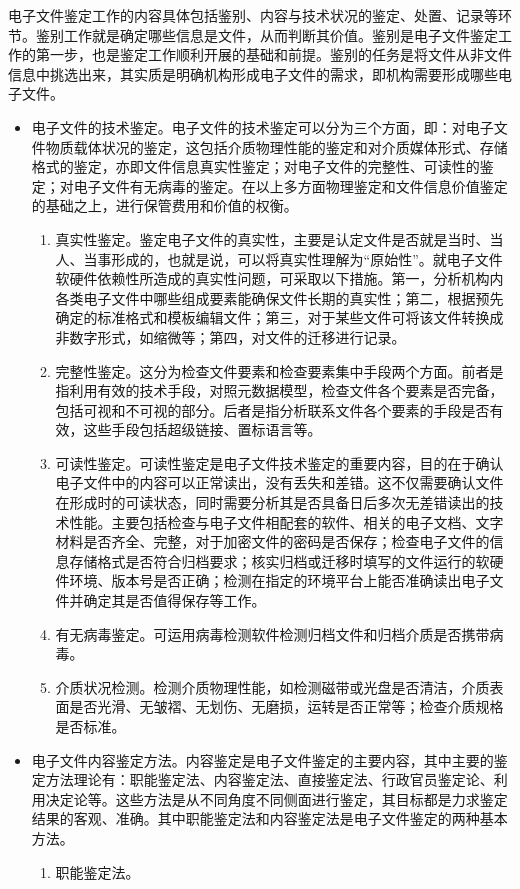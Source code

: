     电子文件鉴定工作的内容具体包括鉴别、内容与技术状况的鉴定、处置、记录等环节。鉴别工作就是确定哪些信息是文件，从而判断其价值。鉴别是电子文件鉴定工作的第一步，也是鉴定工作顺利开展的基础和前提。鉴别的任务是将文件从非文件信息中挑选出来，其实质是明确机构形成电子文件的需求，即机构需要形成哪些电子文件。

    \begin{itemize}
    \item 电子文件的技术鉴定。电子文件的技术鉴定可以分为三个方面，即：对电子文件物质载体状况的鉴定，这包括介质物理性能的鉴定和对介质媒体形式、存储格式的鉴定，亦即文件信息真实性鉴定；对电子文件的完整性、可读性的鉴定；对电子文件有无病毒的鉴定。在以上多方面物理鉴定和文件信息价值鉴定的基础之上，进行保管费用和价值的权衡。
        \begin{enumerate}
            \item  真实性鉴定。鉴定电子文件的真实性，主要是认定文件是否就是当时、当人、当事形成的，也就是说，可以将真实性理解为“原始性”。就电子文件软硬件依赖性所造成的真实性问题，可采取以下措施。第一，分析机构内各类电子文件中哪些组成要素能确保文件长期的真实性；第二，根据预先确定的标准格式和模板编辑文件；第三，对于某些文件可将该文件转换成非数字形式，如缩微等；第四，对文件的迁移进行记录。
            \item  完整性鉴定。这分为检查文件要素和检查要素集中手段两个方面。前者是指利用有效的技术手段，对照元数据模型，检查文件各个要素是否完备，包括可视和不可视的部分。后者是指分析联系文件各个要素的手段是否有效，这些手段包括超级链接、置标语言等。
            \item  可读性鉴定。可读性鉴定是电子文件技术鉴定的重要内容，目的在于确认电子文件中的内容可以正常读出，没有丢失和差错。这不仅需要确认文件在形成时的可读状态，同时需要分析其是否具备日后多次无差错读出的技术性能。主要包括检查与电子文件相配套的软件、相关的电子文档、文字材料是否齐全、完整，对于加密文件的密码是否保存；检查电子文件的信息存储格式是否符合归档要求；核实归档或迁移时填写的文件运行的软硬件环境、版本号是否正确；检测在指定的环境平台上能否准确读出电子文件并确定其是否值得保存等工作。
            \item  有无病毒鉴定。可运用病毒检测软件检测归档文件和归档介质是否携带病毒。
            \item  介质状况检测。检测介质物理性能，如检测磁带或光盘是否清洁，介质表面是否光滑、无皱褶、无划伤、无磨损，运转是否正常等；检查介质规格是否标准。
        \end{enumerate}

    \item 电子文件内容鉴定方法。内容鉴定是电子文件鉴定的主要内容，其中主要的鉴定方法理论有：职能鉴定法、内容鉴定法、直接鉴定法、行政官员鉴定论、利用决定论等。这些方法是从不同角度不同侧面进行鉴定，其目标都是力求鉴定结果的客观、准确。其中职能鉴定法和内容鉴定法是电子文件鉴定的两种基本方法。
        \begin{enumerate}
            \item  职能鉴定法。


\end{enumerate}
\end{itemize}
